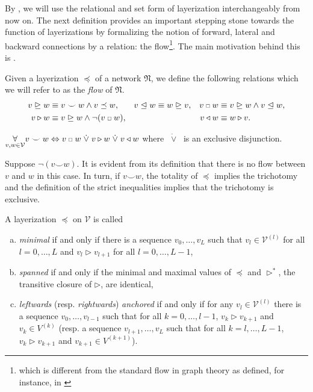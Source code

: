 \documentclass[a4paper,11pt]{report}
\newcommand{\conn}{\smile} %
\newcommand{\smallsquare}{\;\scalebox{0.6}{$\square$}\;}
\newcommand{\xor}{\;\dot{\vee}\;}
\begin{document}
\begin{Par}
By , we will use the relational and set form of layerization interchangeably from now on. The next definition provides an important stepping stone towards the function of layerizations by formalizing the notion of forward, lateral and backward connections by a relation: the flow\footnote{
which is different from the standard flow in graph theory as defined, for instance, in \cite[][149]{Diestel2017}}. The main motivation behind this is .
\end{Par}

\begin{Def}
Given a layerization $\preceq$ of a network $\mathfrak{N}$, we define the following relations which we will refer to as the \emph{flow} of $\mathfrak{N}$.
\begin{equation}
\begin{aligned}
v\trianglerighteq w&\equiv 
v\conn w\wedge v\preceq w,&
v\trianglelefteq w&\equiv w\trianglerighteq v,&
v\smallsquare w&\equiv v\trianglerighteq w\wedge v\trianglelefteq w,\\
v\triangleright w &\equiv v\trianglerighteq w\wedge\neg(v\smallsquare w),&&&
v\triangleleft w&\equiv w\triangleright v.
\end{aligned}
\end{equation}
\end{Def}

\begin{Lem}
$\underset{v,w\in\mathcal{V}}{\forall}v\conn w\Leftrightarrow v\smallsquare w\xor v\triangleright w\xor v\triangleleft w$ where $\xor$ is an exclusive disjunction.
\end{Lem}

\begin{Bew}
Suppose $\neg(v\conn w)$. It is evident from its definition that there is no flow between $v$ and $w$ in this case. In turn, if $v\conn w$, the totality of $\preceq$ implies the trichotomy and the definition of the strict inequalities implies that the trichotomy is exclusive.
\end{Bew}

\begin{Def}
A layerization $\preceq$ on $\mathcal{V}$ is called
\begin{enumerate}[a)]
\item
\emph{minimal} if and only if there is a sequence $v_0,\dotsc,v_L$ such that $v_l\in\mathcal{V}^{(l)}$ for all $l=0,\dotsc, L$ and $v_l\triangleright v_{l+1}$ for all $l=0,\dotsc, L-1$,
\item
\emph{spanned} if and only if the minimal and maximal values of $\preceq$ and $\triangleright^*$, the transitive closure of $\triangleright$, are identical, 
\item
\emph{leftwards} (resp. \emph{rightwards}) \emph{anchored} if and only if for any $v_l\in\mathcal{V}^{(l)}$ there is a sequence $v_0,\dotsc,v_{l-1}$ such that for all $k=0,\dotsc, l-1$, $v_k\triangleright v_{k+1}$ and $v_k\in V^{(k)}$ (resp. a sequence $v_{l+1},\dotsc, v_L$ such that for all $k=l,\dotsc, L-1$, $v_k\triangleright v_{k+1}$ and $v_{k+1}\in V^{(k+1)}$).
\end{enumerate}
\end{Def}
\end{document}
